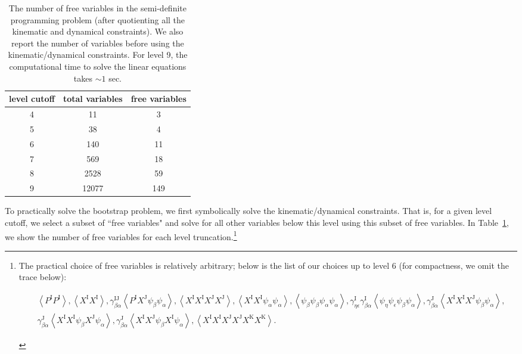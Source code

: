 \documentclass[11pt]{article}
\begin{document}
\begin{table}
\centering
\begin{tabular}{ |c|c|c| } 
\hline
 level cutoff   & total variables& free variables  \\ 
 \hline 
 4              & 11& 3                              \\ 
 \hline
 5              & 38& 4                                 \\
 \hline
 6              &140& 11                                \\
 \hline
 7              &569& 18                                \\
 \hline
 8              & 2528& 59                                \\
 \hline
 9              & 12077& 149                             \\
\hline
\end{tabular}
\caption{\label{tab: freevariables} The number of free variables in the semi-definite programming problem (after quotienting all the kinematic and dynamical constraints). We also report the number of variables before using the kinematic/dynamical constraints. For level 9, the computational time to solve the linear equations takes $\sim 1$ sec.}
\end{table}
To practically solve the bootstrap problem, we first symbolically solve the kinematic/dynamical constraints. That is, for a given level cutoff, we select a subset of ``free variables" and solve for all other variables below this level using this subset of free variables. In Table~\ref{tab: freevariables}, we show the number of free variables for each level truncation.\footnote{The practical choice of free variables is relatively arbitrary; below is the list of our choices up to level $6$ (for compactness, we omit the trace below):
\begin{small}
\begin{equation*}
\begin{split}
    &\left\langle P^{\text{I}}P^{\text{I}}\right\rangle ,\left\langle X^{\text{I}}X^{\text{I}}\right\rangle ,\gamma _{\beta \alpha }^{\text{I}\text{J}} \left\langle P^{\text{I}}X^{\text{J}}\psi _{\beta }\psi _{\alpha }\right\rangle ,\left\langle X^{\text{I}}X^{\text{I}}X^{\text{J}}X^{\text{J}}\right\rangle , \left\langle X^{\text{I}}X^{\text{I}}\psi _{\alpha }\psi _{\alpha }\right\rangle ,\left\langle \psi _{\beta }\psi _{\beta }\psi _{\alpha }\psi _{\alpha }\right\rangle ,\gamma _{\eta \epsilon }^{\text{I}}\gamma _{\beta \alpha }^{\text{I}} \left\langle \psi _{\eta }\psi _{\epsilon }\psi _{\beta }\psi _{\alpha }\right\rangle ,\gamma _{\beta \alpha }^{\text{J}} \left\langle X^{\text{I}}X^{\text{I}}X^{\text{J}}\psi _{\beta }\psi _{\alpha }\right\rangle ,\\
    &\gamma _{\beta \alpha }^{\text{J}} \left\langle X^{\text{I}}X^{\text{I}}\psi _{\beta }X^{\text{J}}\psi _{\alpha }\right\rangle ,\gamma _{\beta \alpha }^{\text{J}} \left\langle X^{\text{I}}X^{\text{J}}\psi _{\beta }X^{\text{I}}\psi _{\alpha }\right\rangle ,\left\langle X^{\text{I}}X^{\text{I}}X^{\text{J}}X^{\text{J}}X^{\text{K}}X^{\text{K}}\right\rangle .
    \end{split}
\end{equation*}
\end{small}
}
\end{document}
